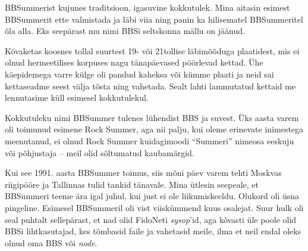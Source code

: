 BBSummerist kujunes traditsioon, igasuvine kokkutulek. Mina aitasin 
esimest BBSummerit ette valmistada ja läbi viia ning panin ka hilisematel BBSummeritel õla alla.
Eks seepärast mu nimi BBSi seltskonna mällu on jäänud.


Kõvaketas koosnes tollal suurtest 19- või 21tollise 
läbimõõduga plaatidest, mis ei olnud 
hermeetilises korpuses nagu tänapäevased pöörlevad kettad. 
Ühe käepidemega varre külge oli pandud kaheksa või kümme plaati ja neid sai 
kettaseadme seest välja tõsta ning vahetada. Sealt lahti lammutatud kettaid me lennutasime küll esimesel 
kokkutulekul. 

Kokkutuleku nimi BBSummer tulenes 
lühendist BBS ja suvest. Üks aasta varem 
oli toimunud esimene Rock Summer, aga nii palju, kui oleme erinevate inimestega 
meenutanud, ei olnud Rock Summer kuidagimoodi \enquote{Summeri} nimeosa 
eeskuju või põhjustaja -- meil olid sõltumatud kaubamärgid. 

Kui see 1991. aasta BBSummer toimus, 
siis mõni päev varem tehti
Moskvas riigipööre ja Tallinnas tulid tankid tänavale. Mina ütlesin seepeale, et BBSummeri teeme ära igal juhul, kui just ei ole 
liikumiskeeldu. Olukord oli üsna pingeline. Esimesel BBSummeril 
oli vist viiskümmend kuus osalejat. Suur hulk oli seal puhtalt sellepärast, et nad olid FidoNeti 
\emph{sysop}'id, aga kõvasti üle poole 
olid BBSi lihtkasutajad, kes tõmbasid faile ja 
vahetasid meile, ilma et neil endal oleks olnud oma BBS või \emph{node}.

